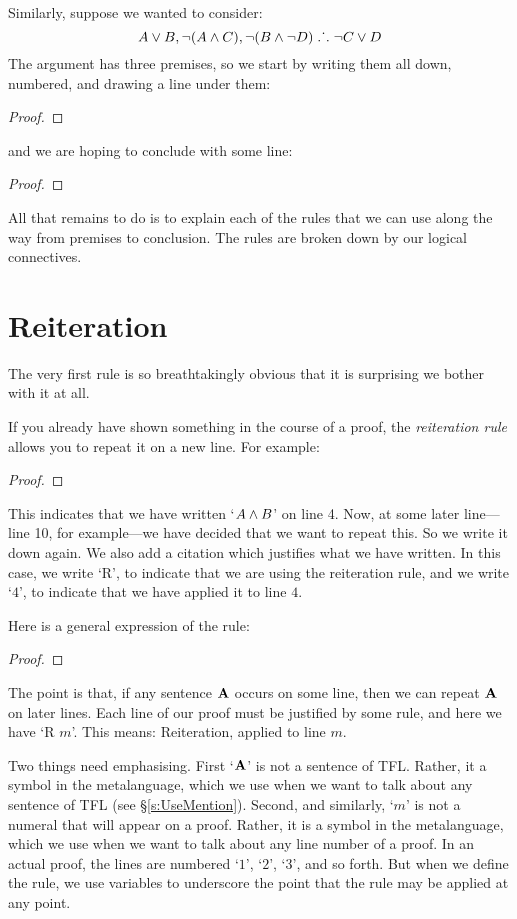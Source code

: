 Similarly, suppose we wanted to consider:
$$A\vee B, \neg (A\wedge C), \neg (B \wedge \neg D) \mathrel{\ldotp\dot{}\,\ldotp} \neg C\vee D$$
The argument has three premises, so we start by writing them all down, numbered, and drawing a line under them:
\begin{proof}
\end{proof}
and we are hoping to conclude with some line:
\begin{proof}
\end{proof}
All that remains to do is to explain each of the rules that we can use along the way from premises to conclusion. The rules are broken down by our logical connectives.


\section{Reiteration}\label{s:Reiteration}
The very first rule is so breathtakingly obvious that it is surprising we bother with it at all. 

If you already have shown something in the course of a proof, the \emph{reiteration rule} allows you to repeat it on a new line. For example:
\begin{proof}
	\have[$\vdots$]{}{\vdots}
	 
\end{proof}
This indicates that we have written `$A \wedge B$' on line 4. Now, at some later line---line 10, for example---we have decided that we want to repeat this. So we write it down again. We also add a citation which justifies what we have written. In this case, we write `R', to indicate that we are using the reiteration rule, and we write `$4$', to indicate that we have applied it to line $4$.

Here is a general expression of the rule:
\begin{proof}
	 
\end{proof}
The point is that, if any sentence $\mathbf{A}$ occurs on some line, then we can repeat $\mathbf{A}$ on later lines. Each line of our proof must be justified by some rule, and here we have `R $m$'. This means: Reiteration, applied to line $m$. 

Two things need emphasising. First `$\mathbf{A}$' is not a sentence of TFL. Rather, it a symbol in the metalanguage, which we use when we want to talk about any sentence of TFL (see \S\ref{s:UseMention}). Second, and similarly, `$m$' is not a numeral that will appear on a proof. Rather, it is a symbol in the metalanguage, which we use when we want to talk about any line number of a proof. In an actual proof, the lines are numbered `$1$', `$2$', `$3$', and so forth. But when we define the rule, we use variables to underscore the point that the rule may be applied at any point.

